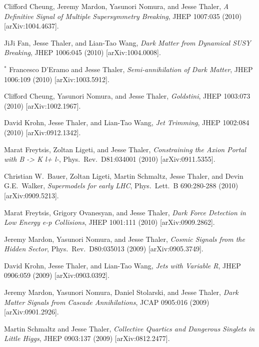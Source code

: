 \begin{list}{[]\addtocounter{jessecount}{-1}}{\leftmargin=3em \itemsep=4pt}
\item
 Clifford Cheung, Jeremy Mardon, Yasunori Nomura, and Jesse Thaler,
\emph{A Definitive Signal of Multiple Supersymmetry Breaking},
JHEP 1007:035 (2010)
[arXiv:1004.4637].

\item
 JiJi Fan, Jesse Thaler, and Lian-Tao Wang,
\emph{Dark Matter from Dynamical SUSY Breaking},
JHEP 1006:045 (2010)
[arXiv:1004.0008].

\item
${}^\ast$ Francesco D'Eramo and Jesse Thaler,
\emph{Semi-annihilation of Dark Matter},
JHEP 1006:109 (2010)
[arXiv:1003.5912].

\item
 Clifford Cheung, Yasunori Nomura, and Jesse Thaler,
\emph{Goldstini},
JHEP 1003:073 (2010)
[arXiv:1002.1967].

\item
 David Krohn, Jesse Thaler, and Lian-Tao Wang,
\emph{Jet Trimming},
JHEP 1002:084 (2010)
[arXiv:0912.1342].

\item
 Marat Freytsis, Zoltan Ligeti, and Jesse Thaler,
\emph{Constraining the Axion Portal with B -> K l+ l-},
Phys.\ Rev.\ D81:034001 (2010)
[arXiv:0911.5355].

\item
 Christian W.\ Bauer, Zoltan Ligeti, Martin Schmaltz, Jesse Thaler, and Devin G.E.\ Walker,
\emph{Supermodels for early LHC},
Phys.\ Lett.\ B 690:280-288 (2010)
[arXiv:0909.5213].

\item
 Marat Freytsis, Grigory Ovanesyan, and Jesse Thaler,
\emph{Dark Force Detection in Low Energy e-p Collisions},
JHEP 1001:111 (2010)
[arXiv:0909.2862].

\item
 Jeremy Mardon, Yasunori Nomura, and Jesse Thaler,
\emph{Cosmic Signals from the Hidden Sector},
Phys.\ Rev.\ D80:035013 (2009)
[arXiv:0905.3749].

\item
 David Krohn, Jesse Thaler, and Lian-Tao Wang,
\emph{Jets with Variable R},
JHEP 0906:059 (2009)
[arXiv:0903.0392].

\item
 Jeremy Mardon, Yasunori Nomura, Daniel Stolarski, and Jesse Thaler,
\emph{Dark Matter Signals from Cascade Annihilations},
JCAP 0905:016 (2009)
[arXiv:0901.2926].

\item
 Martin Schmaltz and Jesse Thaler,
\emph{Collective Quartics and Dangerous Singlets in Little Higgs},
JHEP 0903:137 (2009)
[arXiv:0812.2477].


\end{list}
